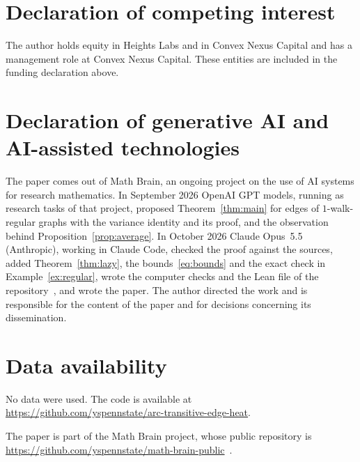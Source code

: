 \documentclass[11pt]{amsart}
\theoremstyle{definition}
\theoremstyle{remark}
\begin{document}
\section*{Declaration of competing interest}
The author holds equity in Heights Labs and in Convex Nexus Capital and
has a management role at Convex Nexus Capital. These entities are included
in the funding declaration above.

\section*{Declaration of generative AI and AI-assisted technologies}
The paper comes out of Math Brain, an ongoing project on the use of AI systems for research mathematics. In September 2026 OpenAI GPT models, running as research tasks of that project, proposed Theorem~\ref{thm:main} for edges of $1$-walk-regular graphs with the variance identity and its proof, and the observation behind Proposition~\ref{prop:average}. In October 2026 Claude Opus~5.5 (Anthropic), working in Claude Code, checked the proof against the sources, added Theorem~\ref{thm:lazy}, the bounds~\eqref{eq:bounds} and the exact check in Example~\ref{ex:regular}, wrote the computer checks and the Lean file of the repository~\cite{code}, and wrote the paper. The author directed the work and is responsible for the content of the paper and for decisions concerning its dissemination.

\section*{Data availability}
No data were used. The code is available at\\ \url{https://github.com/yspennstate/arc-transitive-edge-heat}.

The paper is part of the Math Brain project, whose public repository is \url{https://github.com/yspennstate/math-brain-public}~\cite{MathBrainRepo}.
\end{document}
